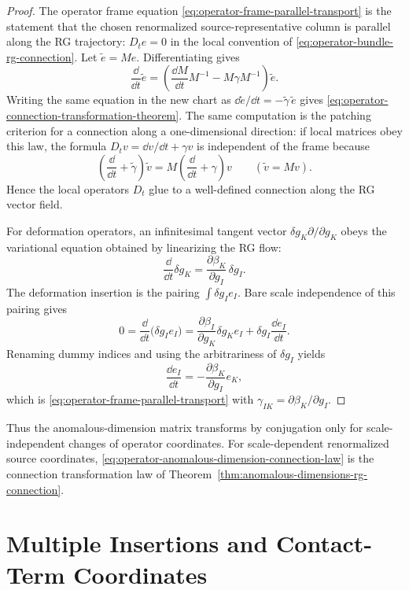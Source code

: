 \begin{proof}
The operator frame equation
\eqref{eq:operator-frame-parallel-transport} is the statement that the chosen
renormalized source-representative column is parallel along the RG trajectory:
\(D_t e=0\) in the local convention of
\eqref{eq:operator-bundle-rg-connection}.  Let \(\widetilde e=M e\).
Differentiating gives
\[
  \frac{\dd}{\dd t}\widetilde e
  =
  \left(\frac{\dd M}{\dd t}M^{-1}-M\gamma M^{-1}\right)\widetilde e .
\]
Writing the same equation in the new chart as
\(\dd\widetilde e/\dd t=-\widetilde\gamma\,\widetilde e\) gives
\eqref{eq:operator-connection-transformation-theorem}.  The same computation
is the patching criterion for a connection along a one-dimensional direction:
if local matrices obey this law, the formula \(D_t v=\dd v/\dd t+\gamma v\)
is independent of the frame because
\[
  \left(\frac{\dd}{\dd t}+\widetilde\gamma\right)\widetilde v
  =
  M\left(\frac{\dd}{\dd t}+\gamma\right)v
  \qquad
  (\widetilde v=Mv).
  \]
Hence the local operators \(D_t\) glue to a well-defined connection along the
RG vector field.

For deformation operators, an infinitesimal tangent vector
\(\delta g_K\partial/\partial g_K\) obeys the variational equation obtained by
linearizing the RG flow:
\[
  \frac{\dd}{\dd t}\delta g_K
  =
  \frac{\partial\beta_K}{\partial g_I}\,\delta g_I .
  \]
The deformation insertion is the pairing
\(\int\delta g_I e_I\).  Bare scale independence of this pairing gives
\[
  0
  =
  \frac{\dd}{\dd t}\bigl(\delta g_I e_I\bigr)
  =
  \frac{\partial\beta_I}{\partial g_K}\delta g_K e_I
  +
  \delta g_I\frac{\dd e_I}{\dd t}.
  \]
Renaming dummy indices and using the arbitrariness of \(\delta g_I\) yields
\[
  \frac{\dd e_I}{\dd t}
  =
  -
  \frac{\partial\beta_K}{\partial g_I}e_K,
  \]
which is \eqref{eq:operator-frame-parallel-transport} with
\(\gamma_{IK}=\partial\beta_K/\partial g_I\).
\end{proof}

Thus the anomalous-dimension matrix transforms by conjugation only for
scale-independent changes of operator coordinates.  For scale-dependent
renormalized source coordinates,
\eqref{eq:operator-anomalous-dimension-connection-law} is the connection
transformation law of Theorem~\ref{thm:anomalous-dimensions-rg-connection}.

\section{Multiple Insertions and Contact-Term Coordinates}
\label{sec:multiple-insertions-contact-coordinates}

